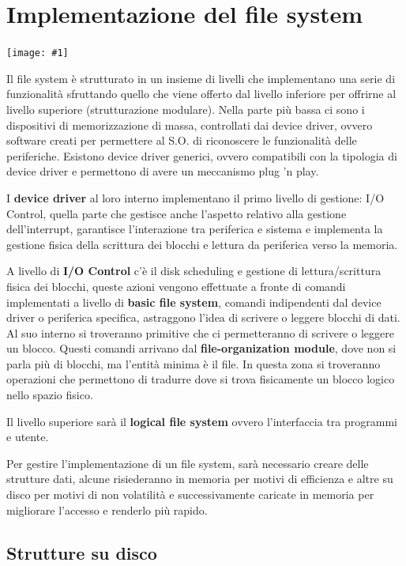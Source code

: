 \documentclass[a4paper, 12pt]{book}
\newcommand{\foto}[1]{\texttt{[image: \#1]}}
\begin{document}
\section{Implementazione del file system}

\foto{file_system.png}

Il file system è strutturato in un insieme di livelli che 
implementano una serie di funzionalità sfruttando quello che 
viene offerto dal livello inferiore per offrirne al livello superiore (strutturazione modulare).
Nella parte più bassa ci sono i dispositivi di memorizzazione 
di massa, controllati dai device driver, ovvero software 
creati per permettere al S.O. di riconoscere le funzionalità 
delle periferiche. Esistono device driver generici, ovvero 
compatibili con la tipologia di device driver e permettono 
di avere un meccanismo plug 'n play.

I \textbf{device driver} al loro interno implementano il primo livello 
di gestione: I/O Control, quella parte che gestisce anche 
l'aspetto relativo alla gestione dell'interrupt, garantisce 
l'interazione tra periferica e sistema e implementa la 
gestione fisica della scrittura dei blocchi e lettura da 
periferica verso la memoria. 

A livello di \textbf{I/O Control} c'è il disk scheduling 
e gestione di lettura/scrittura fisica dei blocchi, queste 
azioni vengono effettuate a fronte di comandi implementati 
a livello di \textbf{basic file system}, comandi indipendenti dal device 
driver o periferica specifica, astraggono l'idea di scrivere o leggere 
blocchi di dati. Al suo interno si troveranno primitive che 
ci permetteranno di scrivere o leggere un blocco. Questi comandi 
arrivano dal \textbf{file-organization module}, dove non si 
parla più di blocchi, ma l'entità minima è il file. In questa zona 
si troveranno operazioni che permettono di tradurre dove si trova 
fisicamente un blocco logico nello spazio fisico.

Il livello superiore sarà il \textbf{logical file system} 
ovvero l'interfaccia tra programmi e utente.

Per gestire l'implementazione di un file system, sarà necessario 
creare delle strutture dati, alcune risiederanno in memoria per 
motivi di efficienza e altre su disco per motivi di non 
volatilità e successivamente caricate in memoria per migliorare 
l'accesso e renderlo più rapido.

\subsection{Strutture su disco}
\end{document}
